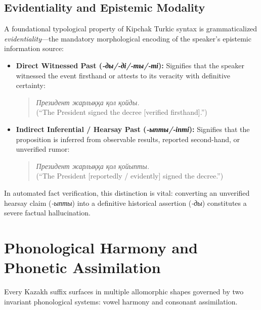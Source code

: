 \subsection{Evidentiality and Epistemic Modality}
A foundational typological property of Kipchak Turkic syntax is grammaticalized \textit{evidentiality}---the mandatory morphological encoding of the speaker's epistemic information source:
\begin{itemize}
    \item \textbf{Direct Witnessed Past (\textit{-ды/-ді/-ты/-ті}):} Signifies that the speaker witnessed the event firsthand or attests to its veracity with definitive certainty:
    \begin{quote}
    \textit{Президент жарлыққа қол қойды.} \\
    \small (``The President signed the decree [verified firsthand].'')
    \end{quote}
    \item \textbf{Indirect Inferential / Hearsay Past (\textit{-ыпты/-іпті}):} Signifies that the proposition is inferred from observable results, reported second-hand, or unverified rumor:
    \begin{quote}
    \textit{Президент жарлыққа қол қойыпты.} \\
    \small (``The President [reportedly / evidently] signed the decree.'')
    \end{quote}
\end{itemize}
In automated fact verification, this distinction is vital: converting an unverified hearsay claim (\textit{-ыпты}) into a definitive historical assertion (\textit{-ды}) constitutes a severe factual hallucination.

\section{Phonological Harmony and Phonetic Assimilation}
\label{sec:ling_harmony}

Every Kazakh suffix surfaces in multiple allomorphic shapes governed by two invariant phonological systems: vowel harmony and consonant assimilation.

